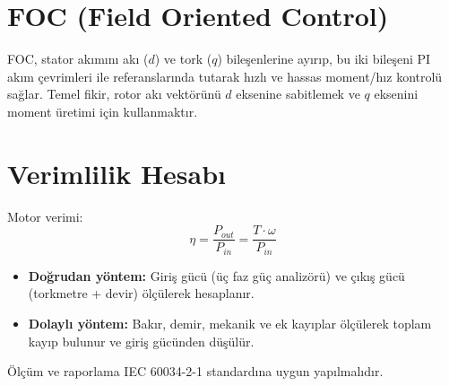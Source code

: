 \section{FOC (Field Oriented Control)} FOC, stator akımını akı ($d$) ve tork ($q$) bileşenlerine ayırıp, bu iki bileşeni PI akım çevrimleri ile referanslarında tutarak hızlı ve hassas moment/hız kontrolü sağlar. Temel fikir, rotor akı vektörünü $d$ eksenine sabitlemek ve $q$ eksenini moment üretimi için kullanmaktır. 

\section{Verimlilik Hesabı} Motor verimi: \begin{equation} \eta = \frac{P_{out}}{P_{in}} = \frac{T \cdot \omega}{P_{in}} \end{equation} \begin{itemize} \item \textbf{Doğrudan yöntem:} Giriş gücü (üç faz güç analizörü) ve çıkış gücü (torkmetre + devir) ölçülerek hesaplanır. \item \textbf{Dolaylı yöntem:} Bakır, demir, mekanik ve ek kayıplar ölçülerek toplam kayıp bulunur ve giriş gücünden düşülür. \end{itemize} Ölçüm ve raporlama IEC 60034-2-1 standardına uygun yapılmalıdır.
 
\medskip




\clearpage
